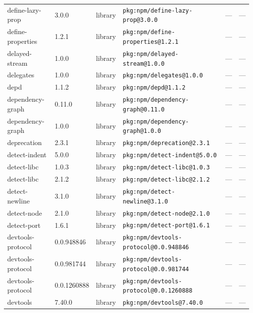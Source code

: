 \documentclass[11pt,a4paper]{article}
\begin{document}
\begin{longtable}{|p{4cm}|p{2cm}|p{1.6cm}|p{5cm}|p{1.5cm}|p{3.5cm}|}
\raggedright define-lazy-prop & 3.0.0 & library & \small\texttt{pkg:npm/define-lazy-prop@3.0.0} & — & \small — \\
\raggedright define-properties & 1.2.1 & library & \small\texttt{pkg:npm/define-properties@1.2.1} & — & \small — \\
\raggedright delayed-stream & 1.0.0 & library & \small\texttt{pkg:npm/delayed-stream@1.0.0} & — & \small — \\
\raggedright delegates & 1.0.0 & library & \small\texttt{pkg:npm/delegates@1.0.0} & — & \small — \\
\raggedright depd & 1.1.2 & library & \small\texttt{pkg:npm/depd@1.1.2} & — & \small — \\
\raggedright dependency-graph & 0.11.0 & library & \small\texttt{pkg:npm/dependency-graph@0.11.0} & — & \small — \\
\raggedright dependency-graph & 1.0.0 & library & \small\texttt{pkg:npm/dependency-graph@1.0.0} & — & \small — \\
\raggedright deprecation & 2.3.1 & library & \small\texttt{pkg:npm/deprecation@2.3.1} & — & \small — \\
\raggedright detect-indent & 5.0.0 & library & \small\texttt{pkg:npm/detect-indent@5.0.0} & — & \small — \\
\raggedright detect-libc & 1.0.3 & library & \small\texttt{pkg:npm/detect-libc@1.0.3} & — & \small — \\
\raggedright detect-libc & 2.1.2 & library & \small\texttt{pkg:npm/detect-libc@2.1.2} & — & \small — \\
\raggedright detect-newline & 3.1.0 & library & \small\texttt{pkg:npm/detect-newline@3.1.0} & — & \small — \\
\raggedright detect-node & 2.1.0 & library & \small\texttt{pkg:npm/detect-node@2.1.0} & — & \small — \\
\raggedright detect-port & 1.6.1 & library & \small\texttt{pkg:npm/detect-port@1.6.1} & — & \small — \\
\raggedright devtools-protocol & 0.0.948846 & library & \small\texttt{pkg:npm/devtools-protocol@0.0.948846} & — & \small — \\
\raggedright devtools-protocol & 0.0.981744 & library & \small\texttt{pkg:npm/devtools-protocol@0.0.981744} & — & \small — \\
\raggedright devtools-protocol & 0.0.1260888 & library & \small\texttt{pkg:npm/devtools-protocol@0.0.1260888} & — & \small — \\
\raggedright devtools & 7.40.0 & library & \small\texttt{pkg:npm/devtools@7.40.0} & — & \small — \\

\end{longtable}
\end{document}
